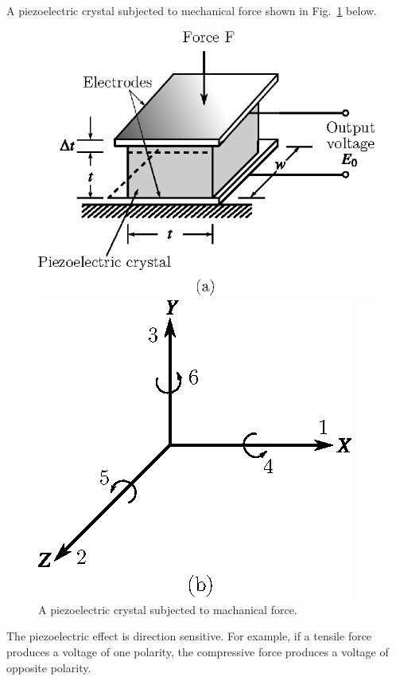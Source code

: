 A piezoelectric crystal subjected to mechanical force shown in
Fig.~\ref{fig9.9} below.
\begin{figure}[H]
\begin{minipage}[b]{7cm}
\centering
\includegraphics{chap9/fig9.7a.eps}
\end{minipage}
\qquad
\begin{minipage}[b]{6.5cm}
\centering
\includegraphics{chap9/fig9.7b.eps}
\end{minipage}
\caption{A piezoelectric crystal subjected to machanical force.}\label{fig9.9}
\end{figure}

The piezoelectric effect is direction sensitive. For example, if a
tensile force produces a voltage of one polarity, the compressive
force produces a voltage of opposite polarity.

